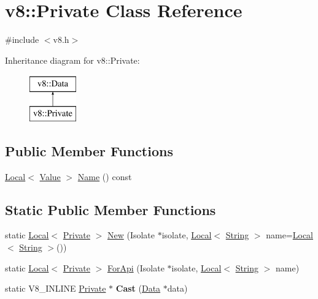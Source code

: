 \hypertarget{classv8_1_1Private}{}\section{v8\+:\+:Private Class Reference}
\label{classv8_1_1Private}


{\ttfamily \#include $<$v8.\+h$>$}

Inheritance diagram for v8\+:\+:Private\+:\begin{figure}[H]
\begin{center}
\leavevmode
\includegraphics[height=2.000000cm]{classv8_1_1Private}
\end{center}
\end{figure}
\subsection*{Public Member Functions}
\begin{DoxyCompactItemize}
\item 
\mbox{\hyperlink{classv8_1_1Local}{Local}}$<$ \mbox{\hyperlink{classv8_1_1Value}{Value}} $>$ \mbox{\hyperlink{classv8_1_1Private_ab3bbd6a2dcf6aea73f65c95f0d216f12}{Name}} () const
\end{DoxyCompactItemize}
\subsection*{Static Public Member Functions}
\begin{DoxyCompactItemize}
\item 
static \mbox{\hyperlink{classv8_1_1Local}{Local}}$<$ \mbox{\hyperlink{classv8_1_1Private}{Private}} $>$ \mbox{\hyperlink{classv8_1_1Private_ae43aa9516121ed7a24cf5bba1654b653}{New}} (Isolate $\ast$isolate, \mbox{\hyperlink{classv8_1_1Local}{Local}}$<$ \mbox{\hyperlink{classv8_1_1String}{String}} $>$ name=\mbox{\hyperlink{classv8_1_1Local}{Local}}$<$ \mbox{\hyperlink{classv8_1_1String}{String}} $>$())
\item 
static \mbox{\hyperlink{classv8_1_1Local}{Local}}$<$ \mbox{\hyperlink{classv8_1_1Private}{Private}} $>$ \mbox{\hyperlink{classv8_1_1Private_a0ab8628387166b8a8abc6e9b6f40ad55}{For\+Api}} (Isolate $\ast$isolate, \mbox{\hyperlink{classv8_1_1Local}{Local}}$<$ \mbox{\hyperlink{classv8_1_1String}{String}} $>$ name)
\item 
\mbox{\label{classv8_1_1Private_a3df565232e66989a2c8a9e708a1e2d86}} 
static V8\+\_\+\+I\+N\+L\+I\+NE \mbox{\hyperlink{classv8_1_1Private}{Private}} $\ast$ {\bfseries Cast} (\mbox{\hyperlink{classv8_1_1Data}{Data}} $\ast$data)
\end{DoxyCompactItemize}


